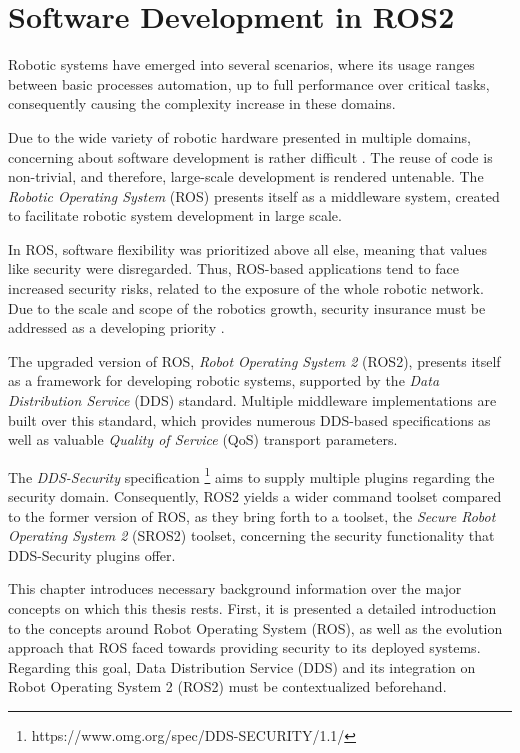 \chapter{Software Development in ROS2}\label{c:ros}

Robotic systems have emerged into several scenarios, where its usage ranges between basic processes automation, up to full performance over critical tasks, consequently causing the complexity increase in these domains. 

Due to the wide variety of robotic hardware presented in multiple domains, concerning about software development is rather difficult \cite{cousins2011exponential}. The reuse of code is non-trivial, and therefore, large-scale development is rendered untenable. The \textit{Robotic Operating System} (ROS) presents itself as a middleware system, created to facilitate robotic system development in large scale.

In ROS, software flexibility was prioritized above all else, meaning that values like security were disregarded. Thus, ROS-based applications tend to face increased security risks, related to the exposure of the whole robotic network. Due to the scale and scope of the robotics growth, security insurance must be addressed as a developing priority \cite{diluoffo2018robot, kim2018security}.

The upgraded version of ROS, \textit{Robot Operating System 2} (ROS2), presents itself as a framework for developing robotic systems, supported by the \textit{Data Distribution Service} (DDS) standard. Multiple middleware implementations are built over this standard, which provides numerous DDS-based specifications as well as valuable \textit{Quality of Service} (QoS) transport parameters.

The \textit{DDS-Security} specification \footnote{https://www.omg.org/spec/DDS-SECURITY/1.1/} aims to supply multiple plugins regarding the security domain. Consequently, ROS2 yields a wider command toolset compared to the former version of ROS, as they bring forth to a toolset, the \textit{Secure Robot Operating System 2} (SROS2) toolset, concerning the security functionality that DDS-Security plugins offer.

This chapter introduces necessary background information over the major concepts on which this thesis rests. First, it is presented a detailed introduction to the concepts around Robot Operating System (ROS), as well as the evolution approach that ROS faced towards providing security to its deployed systems. Regarding this goal, Data Distribution Service (DDS) and its integration on Robot Operating System 2 (ROS2) must be contextualized beforehand.


